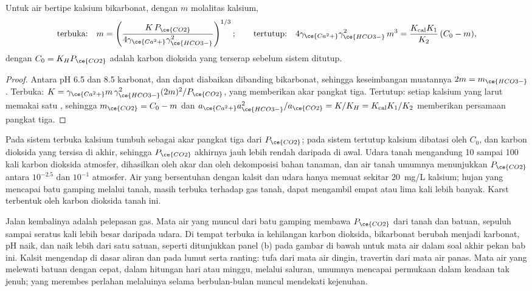 \begin{theorem}\label{thm:b3:water-rock-interaction:calcite}
Untuk air bertipe kalsium bikarbonat, dengan $m$ molalitas kalsium,
\[
\text{terbuka:}\quad m = \left(\frac{K\,P_{\ce{CO2}}}{4\gamma_{\ce{Ca^2+}}
\gamma_{\ce{HCO3-}}^2}\right)^{1/3};
\qquad
\text{tertutup:}\quad 4\gamma_{\ce{Ca^2+}}\gamma_{\ce{HCO3-}}^2\,m^3 =
\frac{K_{\mathrm{cal}}K_1}{K_2}\,(C_0 - m),
\]
dengan $C_0 = K_H P_{\ce{CO2}}$ adalah karbon dioksida yang terserap sebelum
sistem ditutup.
\end{theorem}

\begin{proof}
Antara pH 6.5 dan 8.5 karbonat,  dan  dapat diabaikan dibanding
bikarbonat, sehingga keseimbangan muatannya $2m = m_{\ce{HCO3-}}$. Terbuka: $K = \gamma
_{\ce{Ca^2+}}m\,\gamma_{\ce{HCO3-}}^2(2m)^2/P_{\ce{CO2}}$, yang memberikan
akar pangkat tiga. Tertutup: setiap kalsium yang larut memakai satu , sehingga $m_{\ce{CO2}}
= C_0 - m$ dan $a_{\ce{Ca^2+}}a_{\ce{HCO3-}}^2/a_{\ce{CO2}} = K/K_H =
K_{\mathrm{cal}}K_1/K_2$ memberikan persamaan pangkat tiga.
\end{proof}

Pada sistem terbuka kalsium tumbuh sebagai akar pangkat tiga dari $P_{\ce{CO2}}$; pada
sistem tertutup kalsium dibatasi oleh $C_0$, dan karbon dioksida yang tersisa di
akhir, sehingga $P_{\ce{CO2}}$ akhirnya jauh lebih rendah daripada di awal. Udara tanah
mengandung 10 sampai 100 kali karbon dioksida atmosfer, dihasilkan oleh akar
dan oleh dekomposisi bahan tanaman, dan air tanah umumnya menunjukkan
$P_{\ce{CO2}}$ antara $10^{-2.5}$ dan $10^{-1}$ atmosfer. Air yang bersentuhan
dengan kalsit dan udara hanya memuat sekitar \qty{20}{mg/L} kalsium; hujan yang
mencapai batu gamping melalui tanah, masih terbuka terhadap gas tanah, dapat
mengambil empat atau lima kali lebih banyak. Karst terbentuk oleh karbon dioksida tanah ini.

Jalan kembalinya adalah pelepasan gas. Mata air yang muncul dari batu gamping
membawa $P_{\ce{CO2}}$ dari tanah dan batuan, sepuluh sampai seratus kali lebih besar daripada
udara. Di tempat terbuka ia kehilangan karbon dioksida, bikarbonat berubah menjadi
karbonat, pH naik, dan  naik lebih dari satu satuan,
seperti ditunjukkan panel (b) pada gambar di bawah untuk mata air dalam
soal akhir pekan bab ini.
Kalsit mengendap di dasar aliran dan pada lumut serta ranting: tufa dari
mata air dingin, travertin dari mata air panas. Mata air yang melewati batuan
dengan cepat, dalam hitungan hari atau minggu, melalui saluran, umumnya mencapai permukaan
dalam keadaan tak jenuh; yang merembes perlahan melaluinya selama berbulan-bulan muncul mendekati
kejenuhan.

